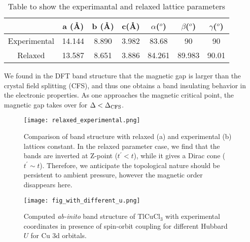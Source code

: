 \documentclass[aps,floatfix,prl]{revtex4}
\begin{document}
\begin{table}[H]
\caption{Table to show the experimantal and relaxed lattice parameters}
\begin{center}
	\begin{tabular}{|c|c|c|c|c|c|c|}
		\hline
		& a (\AA) & b (\AA) & c(\AA) & $\alpha$($^o$) & $\beta$($^o$)&$\gamma$($^o$) \\
		\hline
		Experimental & 14.144 & 8.890 & 3.982 & 83.68 & 90  & 90\\
		\hline
		Relaxed &13.587 &8.651 &3.886 &84.261 &89.983 &90.01 \\
		\hline
	\end{tabular}
\end{center}
\end{table}
We found in the DFT band structure that the magnetic gap is larger than the crystal field splitting (CFS), and thus one obtains a band insulating behavior in the electronic properties. As one approaches the magnetic critical point, the magnetic gap takes over for $\Delta<\Delta_{\rm CFS}$.


\begin{figure}
	\begin{center}
	\texttt{[image: relaxed\_experimental.png]}
	\caption{Comparison of band structure with relaxed (a) and experimental (b) lattices constant. In the relaxed parameter case, we find that the bands are inverted at Z-point ($t^\prime<t$), while it gives a Dirac cone ($t^\prime\sim t$). Therefore, we anticipate the topological nature should be persistent to ambient pressure, however the magnetic order disappears here.}
		\end{center}
\end{figure}

\begin{figure}[h]
	\texttt{[image: fig\_with\_different\_u.png]}
	\caption{\label{phase}Computed {\it ab-inito} band structure of TlCuCl$_3$ with experimental coordinates in presence of spin-orbit coupling for different Hubbard $U$ for Cu 3d orbitals. }
\end{figure}
\end{document}

